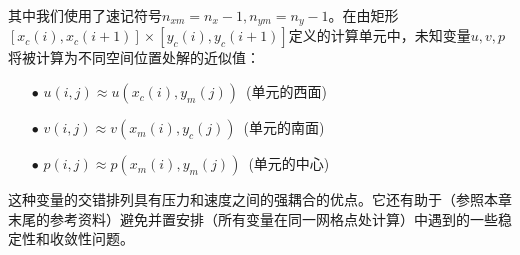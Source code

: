 \documentclass[12pt, a4paper, oneside]{ctexart}
\begin{document}
其中我们使用了速记符号$n_{xm}=n_x-1,n_{ym}=n_y-1$。在由矩形$[x_c(i),x_c(i+1)]\times [y_c(i),y_c(i+1)]$定义的计算单元中，未知变量$u,v,p$ 将被计算为不同空间位置处解的近似值：
\\
\begin{itemize}
    \item[$\bullet$] $u(i,j)\approx u(x_c(i),y_m(j))$\ (单元的西面)
    \item[$\bullet$] $v(i,j)\approx v(x_m(i),y_c(j))$\ (单元的南面)
    \item[$\bullet$] $p(i,j)\approx p(x_m(i),y_m(j))$\ (单元的中心)
\end{itemize}
这种变量的交错排列具有压力和速度之间的强耦合的优点。它还有助于（参照本章末尾的参考资料）避免并置安排（所有变量在同一网格点处计算）中遇到的一些稳定性和收敛性问题。



\end{document}
